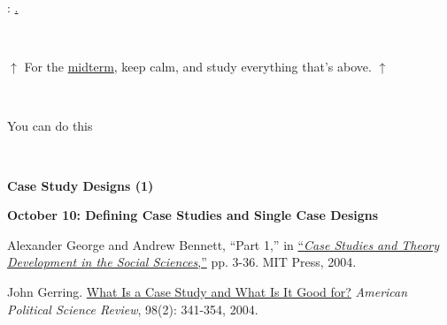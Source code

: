 \documentclass[letterpaper]{article}
\renewenvironment{itemize}{
  \begin{list}{}{
    \setlength{\leftmargin}{1.5em}
  }
}{
  \end{list}
}
\begin{document}
\begin{enumerate}
\vspace{-0.1cm}
\item[] \begin{center}{\color{blue}{\bf Midterm}: \underline{{\unskip}.}}\end{center}
	~\\ 
	\vspace{-1cm}\begin{center}$\uparrow$ {\color{blue}For the \underline{midterm}, keep calm, and study everything that's above.} $\uparrow$ \end{center}
	~\\
	\vspace{-1.5cm}\begin{center}\Smiley{} {\color{blue}You can do this} \Smiley{} \end{center}
	~\\ 

\vspace{-1cm}
\item[] \begin{center}{} \end{center}
\vspace{-0.05cm}


\vspace{-0.01cm}
\item[] \begin{center}{} \end{center}
\vspace{0.5cm}



\item {\bf Case Study Designs (1)}
		
		\begin{itemize}
		\item {\bf October 10: Defining Case Studies and Single Case Designs}
			\begin{itemize}
				\item[$\bullet$] Alexander George and Andrew Bennett, ``Part 1,'' in \href{https://pdfs.semanticscholar.org/94e9/eec015c650880356853533c4dc9b2dac42bb.pdf}{``\emph{Case Studies and Theory Development in the Social Sciences},''} pp. 3-36. MIT Press, 2004.
				\item[$\bullet$] John Gerring. \href{https://www.cambridge.org/core/services/aop-cambridge-core/content/view/S0003055404001182}{What Is a Case Study and What Is It Good for?} \emph{American Political Science Review}, 98(2): 341-354, 2004. 
			\end{itemize}
		\end{itemize}



\end{enumerate}
\end{document}
